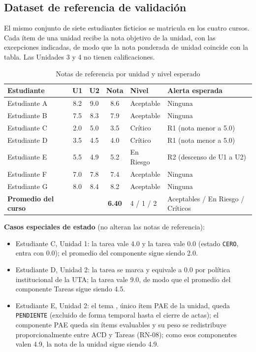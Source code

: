 \documentclass[11pt,a4paper]{article}
\newcommand{\hd}[1]{\textbf{#1}}
\begin{document}
\subsection{Dataset de referencia de validación}
El mismo conjunto de siete estudiantes ficticios se matricula en los cuatro cursos. Cada ítem de una unidad recibe la nota objetivo de la unidad, con las excepciones indicadas, de modo que la nota ponderada de unidad coincide con la tabla. Las Unidades 3 y 4 no tienen calificaciones.

\begin{table}[H]
\centering\small
\caption{Notas de referencia por unidad y nivel esperado}
\begin{tabularx}{\textwidth}{|R{3.2cm}|c|c|c|R{1.9cm}|Y|}
\hline
\hd{Estudiante} & \hd{U1} & \hd{U2} & \hd{Nota} & \hd{Nivel} & \hd{Alerta esperada}\\ \hline
Estudiante A & 8.2 & 9.0 & 8.6 & Aceptable & Ninguna\\ \hline
Estudiante B & 7.5 & 8.3 & 7.9 & Aceptable & Ninguna\\ \hline
Estudiante C & 2.0 & 5.0 & 3.5 & Crítico & R1 (nota menor a 5.0)\\ \hline
Estudiante D & 3.5 & 4.5 & 4.0 & Crítico & R1 (nota menor a 5.0)\\ \hline
Estudiante E & 5.5 & 4.9 & 5.2 & En Riesgo & R2 (descenso de U1 a U2)\\ \hline
Estudiante F & 7.0 & 7.8 & 7.4 & Aceptable & Ninguna\\ \hline
Estudiante G & 8.0 & 8.4 & 8.2 & Aceptable & Ninguna\\ \hline
\textbf{Promedio del curso} & & & \textbf{6.40} & 4 / 1 / 2 & Aceptables / En Riesgo / Críticos\\ \hline
\end{tabularx}
\end{table}

\textbf{Casos especiales de estado} (no alteran las notas de referencia):
\begin{itemize}
  \item Estudiante C, Unidad 1: la tarea  vale 4.0 y la tarea  vale 0.0 (estado \texttt{CERO}, entra con 0.0); el promedio del componente sigue siendo 2.0.
  \item Estudiante D, Unidad 2: la tarea  se marca  y equivale a 0.0 por política institucional de la UTA; la tarea  vale 9.0, de modo que el promedio del componente Tareas sigue siendo 4.5.
  \item Estudiante E, Unidad 2: el tema , único ítem PAE de la unidad, queda \texttt{PENDIENTE} (excluido de forma temporal hasta el cierre de actas); el componente PAE queda sin ítems evaluables y su peso se redistribuye proporcionalmente entre ACD y Tareas (RN-08); como esos componentes valen 4.9, la nota de la unidad sigue siendo 4.9.
\end{itemize}
\end{document}
